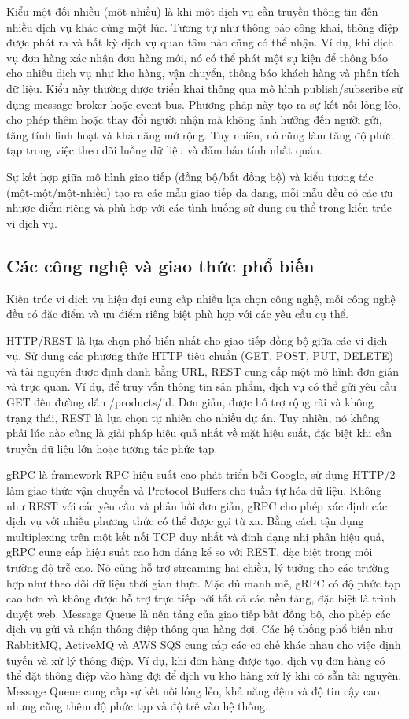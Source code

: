 Kiểu một đối nhiều (một-nhiều) là khi một dịch vụ cần truyền thông tin đến nhiều dịch vụ khác cùng một lúc. Tương tự như thông báo công khai, thông điệp được phát ra và bất kỳ dịch vụ quan tâm nào cũng có thể nhận. Ví dụ, khi dịch vụ đơn hàng xác nhận đơn hàng mới, nó có thể phát một sự kiện để thông báo cho nhiều dịch vụ như kho hàng, vận chuyển, thông báo khách hàng và phân tích dữ liệu. Kiểu này thường được triển khai thông qua mô hình publish/subscribe sử dụng message broker hoặc event bus. Phương pháp này tạo ra sự kết nối lỏng lẻo, cho phép thêm hoặc thay đổi người nhận mà không ảnh hưởng đến người gửi, tăng tính linh hoạt và khả năng mở rộng. Tuy nhiên, nó cũng làm tăng độ phức tạp trong việc theo dõi luồng dữ liệu và đảm bảo tính nhất quán.

Sự kết hợp giữa mô hình giao tiếp (đồng bộ/bất đồng bộ) và kiểu tương tác (một-một/một-nhiều) tạo ra các mẫu giao tiếp đa dạng, mỗi mẫu đều có các ưu nhược điểm riêng và phù hợp với các tình huống sử dụng cụ thể trong kiến trúc vi dịch vụ.

\subsection{Các công nghệ và giao thức phổ biến}
Kiến trúc vi dịch vụ hiện đại cung cấp nhiều lựa chọn công nghệ, mỗi công nghệ đều có đặc điểm và ưu điểm riêng biệt phù hợp với các yêu cầu cụ thể.

HTTP/REST là lựa chọn phổ biến nhất cho giao tiếp đồng bộ giữa các vi dịch vụ. Sử dụng các phương thức HTTP tiêu chuẩn (GET, POST, PUT, DELETE) và tài nguyên được định danh bằng URL, REST cung cấp một mô hình đơn giản và trực quan. Ví dụ, để truy vấn thông tin sản phẩm, dịch vụ có thể gửi yêu cầu GET đến đường dẫn /products/{id}. Đơn giản, được hỗ trợ rộng rãi và không trạng thái, REST là lựa chọn tự nhiên cho nhiều dự án. Tuy nhiên, nó không phải lúc nào cũng là giải pháp hiệu quả nhất về mặt hiệu suất, đặc biệt khi cần truyền dữ liệu lớn hoặc tương tác phức tạp.

gRPC là framework RPC hiệu suất cao phát triển bởi Google, sử dụng HTTP/2 làm giao thức vận chuyển và Protocol Buffers cho tuần tự hóa dữ liệu. Không như REST với các yêu cầu và phản hồi đơn giản, gRPC cho phép xác định các dịch vụ với nhiều phương thức có thể được gọi từ xa. Bằng cách tận dụng multiplexing trên một kết nối TCP duy nhất và định dạng nhị phân hiệu quả, gRPC cung cấp hiệu suất cao hơn đáng kể so với REST, đặc biệt trong môi trường độ trễ cao. Nó cũng hỗ trợ streaming hai chiều, lý tưởng cho các trường hợp như theo dõi dữ liệu thời gian thực. Mặc dù mạnh mẽ, gRPC có độ phức tạp cao hơn và không được hỗ trợ trực tiếp bởi tất cả các nền tảng, đặc biệt là trình duyệt web.
Message Queue là nền tảng của giao tiếp bất đồng bộ, cho phép các dịch vụ gửi và nhận thông điệp thông qua hàng đợi. Các hệ thống phổ biến như RabbitMQ, ActiveMQ và AWS SQS cung cấp các cơ chế khác nhau cho việc định tuyến và xử lý thông điệp. Ví dụ, khi đơn hàng được tạo, dịch vụ đơn hàng có thể đặt thông điệp vào hàng đợi để dịch vụ kho hàng xử lý khi có sẵn tài nguyên. Message Queue cung cấp sự kết nối lỏng lẻo, khả năng đệm và độ tin cậy cao, nhưng cũng thêm độ phức tạp và độ trễ vào hệ thống.

